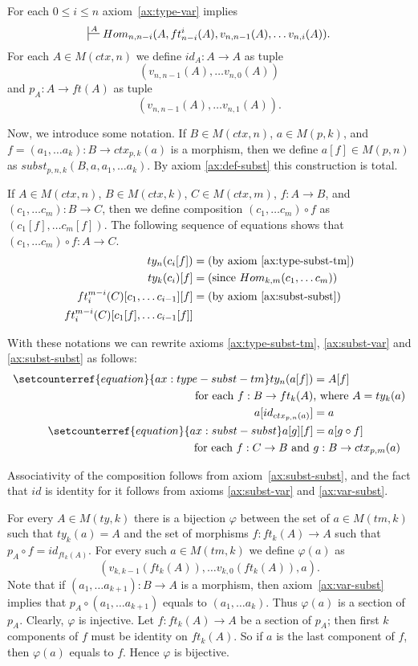 \documentclass{elsarticle}
\theoremstyle{definition}
\theoremstyle{remark}
\numberwithin{figure}{section}
\begin{document}
For each $0 \leq i \leq n$ axiom~\eqref{ax:type-var} implies
\[ \sststile{}{A} Hom_{n,n-i}(A, ft^i_{n-i}(A), v_{n,n-1}(A), \ldots v_{n,i}(A)). \]
For each $A \in M(ctx,n)$ we define $id_A : A \to A$ as tuple
\[ (v_{n,n-1}(A), \ldots v_{n,0}(A)) \]
and $p_A : A \to ft(A)$ as tuple
\[ (v_{n,n-1}(A), \ldots v_{n,1}(A)). \]

Now, we introduce some notation.
If $B \in M(ctx,n)$, $a \in M(p,k)$, and $f = (a_1, \ldots a_k) : B \to ctx_{p,k}(a)$ is a morphism, then we define $a[f] \in M(p,n)$ as $subst_{p,n,k}(B, a, a_1, \ldots a_k)$.
By axiom \eqref{ax:def-subst} this construction is total.

If $A \in M(ctx,n)$, $B \in M(ctx,k)$, $C \in M(ctx,m)$, $f : A \to B$, and $(c_1, \ldots c_m) : B \to C$,
    then we define composition $(c_1, \ldots c_m) \circ f$ as $(c_1[f], \ldots c_m[f])$.
The following sequence of equations shows that $(c_1, \ldots c_m) \circ f : A \to C$.
\begin{align*}
ty_n(c_i[f]) & = \text{(by axiom~\eqref{ax:type-subst-tm})} \\
ty_k(c_i)[f] & = \text{(since $Hom_{k,m}(c_1, \ldots c_m)$)} \\
ft^{m-i}_i(C)[c_1, \ldots c_{i-1}][f] & = \text{(by axiom~\eqref{ax:subst-subst})} \\
ft^{m-i}_i(C)[c_1[f], \ldots c_{i-1}[f]] &
\end{align*}

With these notations we can rewrite axioms \eqref{ax:type-subst-tm}, \eqref{ax:subst-var} and \eqref{ax:subst-subst} as follows:
\begin{align}
\setcounterref{equation}{ax:type-subst-tm}
\addtocounter{equation}{-1}
ty_n(a[f]) & = A[f] \\ \notag
\text{ for each } f : B \to ft_k(A) & \text{, where } A = ty_k(a) \\
a[id_{ctx_{p,n}(a)}] & = a \\
\setcounterref{equation}{ax:subst-subst}
\addtocounter{equation}{-1}
a[g][f] & = a[g \circ f] \\ \notag
\text{ for each } f : C \to B \text{ and } & g : B \to ctx_{p,m}(a)
\end{align}

Associativity of the composition follows from axiom~\eqref{ax:subst-subst}, and the fact that $id$ is identity for it follows from axioms \eqref{ax:subst-var} and \eqref{ax:var-subst}.

For every $A \in M(ty,k)$ there is a bijection $\varphi$ between the set of $a \in M(tm,k)$ such that $ty_k(a) = A$
    and the set of morphisms $f : ft_k(A) \to A$ such that $p_A \circ f = id_{ft_k(A)}$.
For every such $a \in M(tm,k)$ we define $\varphi(a)$ as
\[ (v_{k,k-1}(ft_k(A)), \ldots v_{k,0}(ft_k(A)), a). \]
Note that if $(a_1, \ldots a_{k+1}) : B \to A$ is a morphism, then axiom~\eqref{ax:var-subst} implies that $p_A \circ (a_1, \ldots a_{k+1})$ equals to $(a_1, \ldots a_k)$.
Thus $\varphi(a)$ is a section of $p_A$.
Clearly, $\varphi$ is injective.
Let $f : ft_k(A) \to A$ be a section of $p_A$; then first $k$ components of $f$ must be identity on $ft_k(A)$.
So if $a$ is the last component of $f$, then $\varphi(a)$ equals to $f$.
Hence $\varphi$ is bijective.
\end{document}
